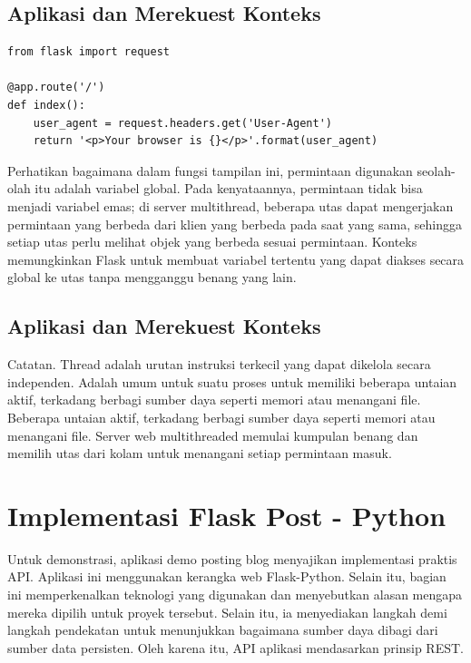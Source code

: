 \subsection{Aplikasi dan Merekuest Konteks}
\begin{verbatim}
from flask import request

@app.route('/')
def index():
	user_agent = request.headers.get('User-Agent')
	return '<p>Your browser is {}</p>'.format(user_agent)
\end{verbatim}
Perhatikan bagaimana dalam fungsi tampilan ini, permintaan digunakan seolah-olah itu adalah variabel global. Pada kenyataannya, permintaan tidak bisa menjadi variabel emas; di server multithread, beberapa utas dapat mengerjakan permintaan yang berbeda dari klien yang berbeda pada saat yang sama, sehingga setiap utas perlu melihat objek yang berbeda sesuai permintaan. Konteks memungkinkan Flask untuk membuat variabel tertentu yang dapat diakses secara global ke utas tanpa mengganggu benang yang lain\cite{grinberg2018flask}.

\subsection{Aplikasi dan Merekuest Konteks}
Catatan.
Thread adalah urutan instruksi terkecil yang dapat dikelola secara independen. Adalah umum untuk suatu proses untuk memiliki beberapa untaian aktif, terkadang berbagi sumber daya seperti memori atau menangani file. Beberapa untaian aktif, terkadang berbagi sumber daya seperti memori atau menangani file. Server web multithreaded memulai kumpulan benang dan memilih utas dari kolam untuk menangani setiap permintaan masuk\cite{grinberg2018flask}.

\section{Implementasi Flask Post - Python}
Untuk demonstrasi, aplikasi demo posting blog menyajikan implementasi praktis API. Aplikasi ini menggunakan kerangka web Flask-Python. Selain itu, bagian ini memperkenalkan teknologi yang digunakan dan menyebutkan alasan mengapa mereka dipilih untuk proyek tersebut. Selain itu, ia menyediakan langkah demi langkah pendekatan untuk menunjukkan bagaimana sumber daya dibagi dari sumber data persisten. Oleh karena itu, API aplikasi mendasarkan prinsip REST\cite{alemu2014rest}.

